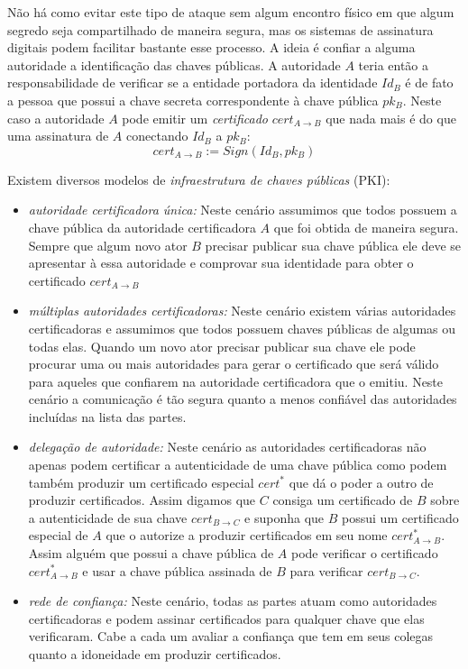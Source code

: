 Não há como evitar este tipo de ataque sem algum encontro físico em que algum segredo seja compartilhado de maneira segura, mas os sistemas de assinatura digitais podem facilitar bastante esse processo.
A ideia é confiar a alguma autoridade a identificação das chaves públicas.
A autoridade $A$ teria então a responsabilidade de verificar se a entidade portadora da identidade $Id_B$ é de fato a pessoa que possui a chave secreta correspondente à chave pública $pk_B$.
Neste caso a autoridade $A$ pode emitir um {\em certificado} $cert_{A \to B}$ que nada mais é do que uma assinatura de $A$ conectando $Id_B$ a $pk_B$:
\begin{displaymath}
  cert_{A \to B} := Sign(Id_B, pk_B)
\end{displaymath}

Existem diversos modelos de {\em infraestrutura de chaves públicas} (PKI):
\begin{itemize}
\item {\em autoridade certificadora única:} Neste cenário assumimos que todos possuem a chave pública da autoridade certificadora $A$ que foi obtida de maneira segura. 
Sempre que algum novo ator $B$ precisar publicar sua chave pública ele deve se apresentar à essa autoridade e comprovar sua identidade para obter o certificado $cert_{A \to B}$
\item {\em múltiplas autoridades certificadoras:} Neste cenário existem várias autoridades certificadoras e assumimos que todos possuem chaves públicas de algumas ou todas elas.
Quando um novo ator precisar publicar sua chave ele pode procurar uma ou mais autoridades para gerar o certificado que será válido para aqueles que confiarem na autoridade certificadora que o emitiu.
Neste cenário a comunicação é tão segura quanto a menos confiável das autoridades incluídas na lista das partes.
\item {\em delegação de autoridade:} Neste cenário as autoridades certificadoras não apenas podem certificar a autenticidade de uma chave pública como podem também produzir um certificado especial $cert^*$ que dá o poder a outro de produzir certificados. 
Assim digamos que $C$ consiga um certificado de $B$ sobre a autenticidade de sua chave $cert_{B \to C}$ e suponha que $B$ possui um certificado especial de $A$ que o autorize a produzir certificados em seu nome $cert^*_{A \to B}$.
Assim alguém que possui a chave pública de $A$ pode verificar o certificado $cert^*_{A \to B}$ e usar a chave pública assinada de $B$ para verificar $cert_{B \to C}$.
\item {\em rede de confiança:} Neste cenário, todas as partes atuam como autoridades certificadoras e podem assinar certificados para qualquer chave que elas verificaram.
Cabe a cada um avaliar a confiança que tem em seus colegas quanto a idoneidade em produzir certificados.
\end{itemize}

